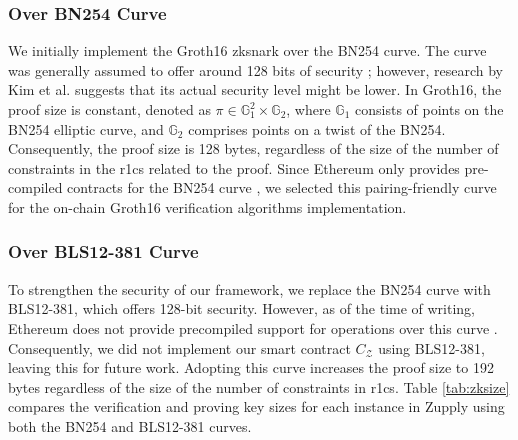 \subsubsection{Over BN254 Curve}
We initially implement the Groth16 \gls{zksnark} over the BN254 curve. The curve was generally assumed to offer around 128 bits of security \cite{BNcurve}; however, research by Kim et al. \cite{Kim2015Extended} suggests that its actual security level might be lower. In Groth16, the proof size is constant, denoted as \(\pi \in \mathbb{G}_1^2 \times \mathbb{G}_2\), where \(\mathbb{G}_1\) consists of points on the BN254 elliptic curve, and \(\mathbb{G}_2\) comprises points on a twist of the BN254. Consequently, the proof size is 128 bytes, regardless of the size of the number of constraints in the \gls{r1cs} related to the proof.
Since Ethereum only provides pre-compiled contracts for the BN254 curve \cite{EIP197, Housni2022Families}, we selected this pairing-friendly curve for the on-chain Groth16 verification algorithms implementation. 

\subsubsection{Over BLS12-381 Curve}
To strengthen the security of our framework, we replace the BN254 curve with BLS12-381, which offers 128-bit security. However, as of the time of writing, Ethereum does not provide precompiled support for operations over this curve \cite{Vlasov2020}. Consequently, we did not implement our smart contract $C_\mathcal{Z}$ using BLS12-381, leaving this for future work. Adopting this curve increases the proof size to 192 bytes regardless of the size of the number of constraints in  \gls{r1cs}. Table \ref{tab:zksize} compares the verification and proving key sizes for each instance in Zupply using both the BN254 and BLS12-381 curves.

